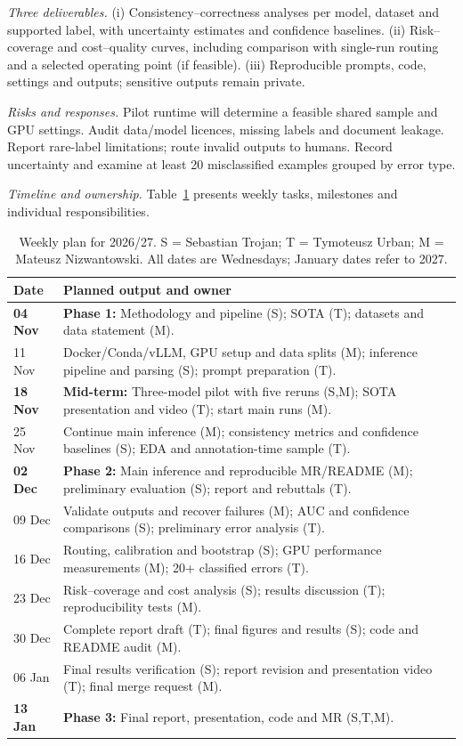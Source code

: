 \documentclass[11pt]{article}
\begin{document}
\begin{enumerate}
\textit{Three deliverables.}
(i) Consistency--correctness analyses per model, dataset and supported label, with uncertainty estimates and confidence baselines.
(ii) Risk--coverage and cost--quality curves, including comparison with single-run routing and a selected operating point (if feasible).
(iii) Reproducible prompts, code, settings and outputs; sensitive outputs remain private.

\textit{Risks and responses.}
Pilot runtime will determine a feasible shared sample and GPU settings. Audit data/model licences, missing labels and document leakage. Report rare-label limitations; route invalid outputs to humans. Record uncertainty and examine at least 20 misclassified examples grouped by error type.

\textit{Timeline and ownership.}
Table~\ref{tab:work-plan} presents weekly tasks, milestones and individual responsibilities.

\begin{table}[H]
\centering
\footnotesize
\begin{tabular}{@{}p{1.15cm}@{\hspace{5pt}}p{5.15cm}@{}}
\hline
Date & Planned output and owner\\
\hline
\textbf{04 Nov} &
\textbf{Phase 1:} Methodology and pipeline (S); SOTA (T); datasets and data statement (M).\\
11 Nov &
Docker/Conda/vLLM, GPU setup and data splits (M); inference pipeline and parsing (S); prompt preparation (T).\\
\textbf{18 Nov} &
\textbf{Mid-term:} Three-model pilot with five reruns (S,M); SOTA presentation and video (T); start main runs (M).\\
25 Nov &
Continue main inference (M); consistency metrics and confidence baselines (S); EDA and annotation-time sample (T).\\
\textbf{02 Dec} &
\textbf{Phase 2:} Main inference and reproducible MR/README (M); preliminary evaluation (S); report and rebuttals (T).\\
09 Dec &
Validate outputs and recover failures (M); AUC and confidence comparisons (S); preliminary error analysis (T).\\
16 Dec &
Routing, calibration and bootstrap (S); GPU performance measurements (M); 20+ classified errors (T).\\
23 Dec &
Risk--coverage and cost analysis (S); results discussion (T); reproducibility tests (M).\\
30 Dec &
Complete report draft (T); final figures and results (S); code and README audit (M).\\
06 Jan &
Final results verification (S); report revision and presentation video (T); final merge request (M).\\
\textbf{13 Jan} &
\textbf{Phase 3:} Final report, presentation, code and MR (S,T,M).\\
\hline
\end{tabular}
\caption{Weekly plan for 2026/27. S = Sebastian Trojan; T = Tymoteusz Urban; M = Mateusz Nizwantowski. All dates are Wednesdays; January dates refer to 2027.}
\label{tab:work-plan}
\end{table}



\end{enumerate}
\end{document}
